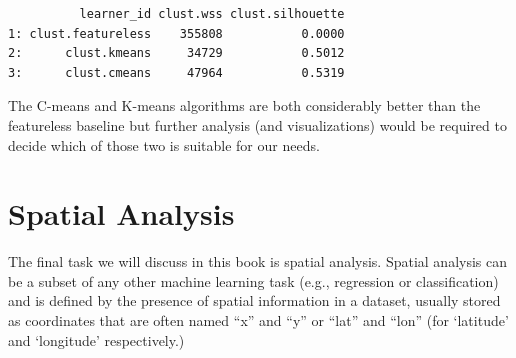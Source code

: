 \begin{Shaded}
\begin{Highlighting}[]
\OtherTok{=} \NormalTok{(}\NormalTok{)}
\OtherTok{=} \NormalTok{(}
  \NormalTok{(}\NormalTok{),}
  \NormalTok{(}\NormalTok{, }
  \NormalTok{(}\NormalTok{, }
\NormalTok{)}
\OtherTok{=} \NormalTok{(}\NormalTok{(}\NormalTok{), }\NormalTok{(}\NormalTok{))}
\OtherTok{=} \NormalTok{(}
  \NormalTok{(}\NormalTok{)))}
\SpecialCharTok{$}\NormalTok{(measures)[, }\NormalTok{(}\NormalTok{, }\NormalTok{, }\NormalTok{)]}
\end{Highlighting}
\end{Shaded}

\begin{verbatim}
          learner_id clust.wss clust.silhouette
1: clust.featureless    355808           0.0000
2:      clust.kmeans     34729           0.5012
3:      clust.cmeans     47964           0.5319
\end{verbatim}

The C-means and K-means algorithms are both considerably better than the
featureless baseline but further analysis (and visualizations) would be
required to decide which of those two is suitable for our needs.

\hypertarget{sec-spatiotemporal}{%
\section{Spatial Analysis}\label{sec-spatiotemporal}}

The final task we will discuss in this book is spatial
analysis. Spatial analysis can be a subset of
any other machine learning task (e.g., regression or classification) and
is defined by the presence of spatial information in a dataset, usually
stored as coordinates that are often named ``x'' and ``y'' or ``lat''
and ``lon'' (for `latitude' and `longitude' respectively.)

